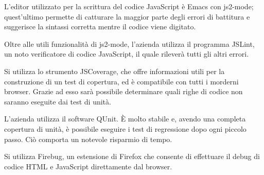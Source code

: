 L'editor utilizzato per la scrittura del codice JavaScript \`e Emacs con js2-mode; quest'ultimo permette di catturare la maggior parte degli errori di battitura e suggerisce la sintassi corretta mentre il codice viene digitato. 
 
Oltre alle utili funzionalit\`a di js2-mode, l'azienda utilizza il programma JSLint, un noto verificatore di codice JavaScript, il quale rilever\`a tutti gli altri errori.

Si utilizza lo strumento JSCoverage, che offre informazioni utili per la construzione di un test di copertura, ed \`e compatibile con tutti i morderni browser. Grazie ad esso sar\`a possibile determinare quali righe di codice non saranno eseguite dai test di unit\`a.

L'azienda utilizza il software QUnit. \`E molto stabile e, avendo una completa copertura di unit\`a,  \`e possibile eseguire i test di regressione dopo ogni piccolo passo. Ci\`o comporta un notevole risparmio di tempo.

Si utilizza Firebug, un estensione di Firefox che consente di effettuare il debug di codice HTML e JavaScript direttamente dal browser.

 

